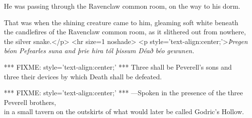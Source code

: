 He was passing through the Ravenclaw common room, on the way to his dorm.

That was when the shining creature came to him, gleaming soft white beneath the 
candlefires of the Ravenclaw common room, as it slithered out from nowhere, the 
silver snake.</p>
<hr size=1 noshade>
<p style='text-align:center;'>\emph{Þregen béon Pefearles suna and þrie hira 
tól þissum Déað béo gewunen.}

*** FIXME: style='text-align:center;' ***
Three shall be Peverell's sons and three their devices by which Death shall be 
defeated.

*** FIXME: style='text-align:center;' ***
---Spoken in the presence of the three Peverell brothers,\\
in a small tavern on the outskirts of what would later be called Godric's 
Hollow.